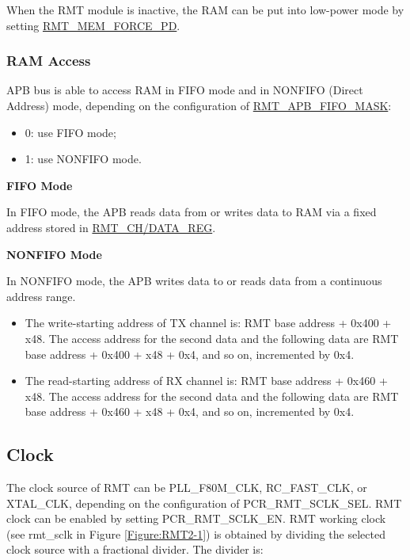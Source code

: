\documentclass[main\_\_EN.tex]{subfiles}
\begin{document}
When the RMT module is inactive, the RAM can be put into low-power mode by setting  \hyperref[fielddesc:RMTMEMFORCEPD]{RMT\_MEM\_FORCE\_PD}.

\subsubsection{RAM Access}
APB bus is able to access RAM in FIFO mode and in NONFIFO (Direct Address) mode, depending on the configuration of \hyperref[fielddesc:RMTAPBFIFOMASK]{RMT\_APB\_FIFO\_MASK}:
\begin{itemize}
    \item 0: use FIFO mode;
    \item 1: use NONFIFO mode.
\end{itemize}

\textbf{FIFO Mode}

In FIFO mode, the APB reads data from or writes data to RAM via a fixed address stored in \hyperref[regdesc:RMTCHNDATAREG]{RMT\_CH/DATA\_REG}.

\textbf{NONFIFO Mode}

In NONFIFO mode, the APB writes data to or reads data from a continuous address range.
\begin{itemize}
    \item The write-starting address of TX channel  is: RMT base address + 0x400 + x48. The access address for the second data and the following data are RMT base address + 0x400 + x48 + 0x4, and so on, incremented by 0x4. 
    \item The read-starting address of RX channel  is: RMT base address + 0x460 + x48. The access address for the second data and the following data are RMT base address + 0x460 + x48 + 0x4, and so on, incremented by 0x4. 
\end{itemize}



\subsection{Clock}\label{clock}
The clock source of RMT can be PLL\_F80M\_CLK, RC\_FAST\_CLK, or XTAL\_CLK, depending on the configuration of PCR\_RMT\_SCLK\_SEL. RMT clock can be enabled by setting PCR\_RMT\_SCLK\_EN. RMT working clock (see rmt\_sclk in Figure \ref{Figure:RMT2-1}) is obtained by dividing the selected clock source with a fractional divider. The divider is: 
\end{document}
